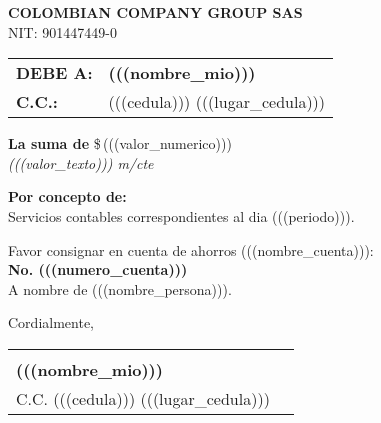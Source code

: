 \documentclass[11pt,a4paper]{article}
\begin{document}
\vspace*{1cm}

\begin{center}
  {\LARGE\bfseries COLOMBIAN COMPANY GROUP SAS}\\[4pt]
  {\small\scshape NIT: 901447449-0}
\end{center}

\vspace{1cm}

\noindent
\begin{tabular}{@{}p{} p{}@{}}
\textbf{DEBE A:} & \textbf{(((nombre_mio)))} \\
\textbf{C.C.:}   & (((cedula))) (((lugar_cedula))) \\[6pt]
\end{tabular}

\vspace{0.8cm}

\begin{mdframed}[style=amountbox]
  \textbf{La suma de} \hfill {\LARGE \$\,(((valor_numerico)))} \\
  \textit{(((valor_texto))) m/cte}
\end{mdframed}


\vspace{0.8cm}

\noindent
\textbf{Por concepto de:}\\
Servicios contables correspondientes al dia (((periodo))).

\vspace{1cm}

\noindent
\begin{minipage}{0.6\textwidth}
  Favor consignar en cuenta de ahorros (((nombre_cuenta))):\\
  \textbf{No. (((numero_cuenta)))}\\
  A nombre de (((nombre_persona))).
\end{minipage}

\hfill

\vspace{2cm}

\noindent
Cordialmente,\\[1.5cm]
\noindent
\begin{tabular}{@{}p{6.5cm}@{}p{6.5cm}@{}}
\cline{1-1}
 & \\
\textbf{(((nombre_mio)))} & \\
C.C. (((cedula))) (((lugar_cedula))) &
\end{tabular}
\end{document}

